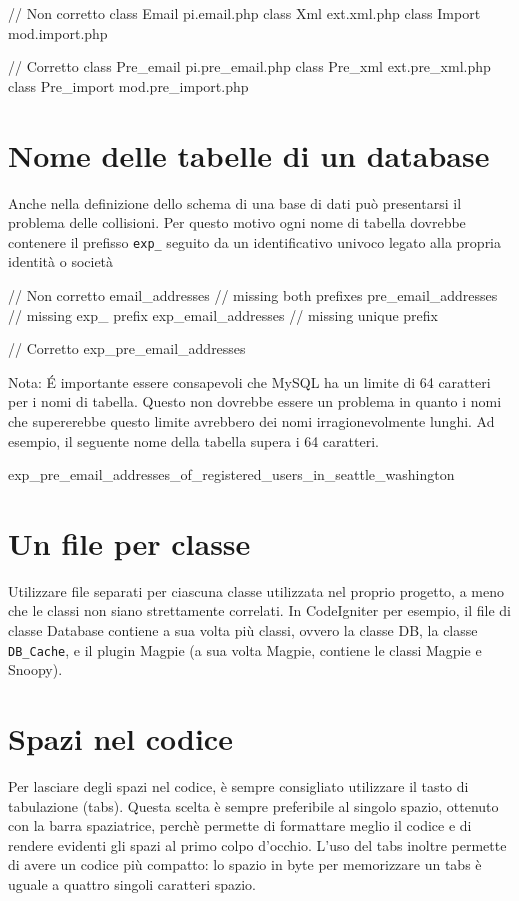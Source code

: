 \begin{code}
// Non corretto
class Email		pi.email.php
class Xml		ext.xml.php
class Import		mod.import.php

// Corretto
class Pre_email		pi.pre_email.php
class Pre_xml		ext.pre_xml.php
class Pre_import	mod.pre_import.php
\end{code}

\section*{Nome delle tabelle di un database}
Anche nella definizione dello schema di una base di dati può presentarsi il problema delle collisioni. Per questo motivo ogni nome di tabella dovrebbe contenere il prefisso \verb|exp_| seguito da un identificativo univoco legato alla propria identità o società

\begin{code}
// Non corretto
email_addresses		// missing both prefixes
pre_email_addresses	// missing exp_ prefix
exp_email_addresses	// missing unique prefix

// Corretto
exp_pre_email_addresses
\end{code}

Nota: \'E importante essere consapevoli che MySQL ha un limite di 64 caratteri per i nomi di tabella. Questo non dovrebbe essere un problema in quanto i nomi che supererebbe questo limite avrebbero dei nomi irragionevolmente lunghi. Ad esempio, il seguente nome della tabella supera i 64 caratteri. 

\begin{code}
exp_pre_email_addresses_of_registered_users_in_seattle_washington
\end{code}

\section*{Un file per classe}
Utilizzare file separati per ciascuna classe utilizzata nel proprio progetto, a meno che le classi non siano strettamente correlati. In CodeIgniter per esempio, il file di classe Database contiene a sua volta più classi, ovvero la classe DB, la classe \verb|DB_Cache|, e il plugin Magpie (a sua volta Magpie, contiene le classi Magpie e Snoopy).

\section*{Spazi nel codice}
Per lasciare degli spazi nel codice, è sempre consigliato utilizzare il tasto di tabulazione (tabs). Questa scelta è sempre preferibile al singolo spazio, ottenuto con la barra spaziatrice, perchè permette di formattare meglio il codice e di rendere evidenti gli spazi al primo colpo d'occhio. L'uso del tabs inoltre permette di avere un codice più compatto: lo spazio in byte per memorizzare un tabs è uguale a quattro singoli caratteri spazio.

